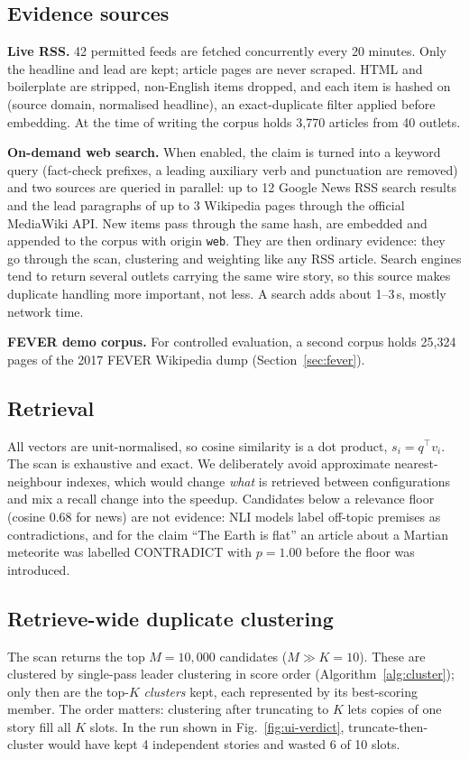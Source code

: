 \documentclass[conference,a4paper]{IEEEtran}
\begin{document}
\subsection{Evidence sources}
\textbf{Live RSS.} 42 permitted feeds are fetched concurrently every 20 minutes. Only the headline and lead are kept;
article pages are never scraped. HTML and boilerplate are stripped, non-English items dropped, and each item is
hashed on (source domain, normalised headline), an exact-duplicate filter applied before embedding. At the time of
writing the corpus holds 3,770 articles from 40 outlets.

\textbf{On-demand web search.} When enabled, the claim is turned into a keyword query (fact-check prefixes, a leading
auxiliary verb and punctuation are removed) and two sources are queried in parallel: up to 12 Google News RSS search
results and the lead paragraphs of up to 3 Wikipedia pages through the official MediaWiki API. New items pass through
the same hash, are embedded and appended to the corpus with origin \texttt{web}. They are then ordinary evidence: they
go through the scan, clustering and weighting like any RSS article. Search engines tend to return several outlets
carrying the same wire story, so this source makes duplicate handling more important, not less. A search adds about
1--3\,s, mostly network time.

\textbf{FEVER demo corpus.} For controlled evaluation, a second corpus holds 25,324 pages of the 2017 FEVER Wikipedia
dump (Section~\ref{sec:fever}).

\subsection{Retrieval}
All vectors are unit-normalised, so cosine similarity is a dot product, $s_i=q^\top v_i$. The scan is exhaustive and
exact. We deliberately avoid approximate nearest-neighbour indexes, which would change \emph{what} is retrieved between
configurations and mix a recall change into the speedup. Candidates below a relevance floor (cosine 0.68 for news)
are not evidence: NLI models label off-topic premises as contradictions, and for the claim ``The Earth is flat'' an
article about a Martian meteorite was labelled CONTRADICT with $p=1.00$ before the floor was introduced.

\subsection{Retrieve-wide duplicate clustering}
The scan returns the top $M=10{,}000$ candidates ($M\gg K=10$). These are clustered by single-pass leader clustering
in score order (Algorithm~\ref{alg:cluster}); only then are the top-$K$ \emph{clusters} kept, each represented by its
best-scoring member. The order matters: clustering after truncating to $K$ lets copies of one story fill all $K$
slots. In the run shown in Fig.~\ref{fig:ui-verdict}, truncate-then-cluster would have kept 4 independent stories and
wasted 6 of 10 slots.
\end{document}
